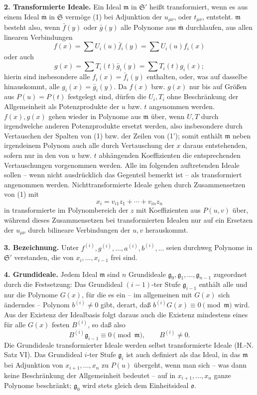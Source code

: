 \documentclass[11pt]{article}
\providecommand{\frakS}{\mathfrak S}
\providecommand{\frakm}{\mathfrak m}
\providecommand{\frakg}{\mathfrak g}
\providecommand{\frako}{\mathfrak o}
\providecommand{\barfrakm}{\overline{\mathfrak m}}
\begin{document}
\textbf{2. Transformierte Ideale.} Ein Ideal $\frakm$ in $\frakS'$ heißt transformiert, wenn es aus einem Ideal $\barfrakm$ in $\frakS$ vermöge (1) bei Adjunktion der $u_{\mu\nu}$, oder $t_{\mu\nu}$, entsteht. $\frakm$ besteht also, wenn $\bar f(y)$ oder $\bar g(y)$ alle Polynome aus $\barfrakm$ durchlaufen, aus allen linearen Verbindungen
\[
 f(x)=\sum U_i(u)\bar f_i(y)=\sum U_i(u)f_i(x)
\]
oder auch
\[
 g(x)=\sum T_i(t)\bar g_i(y)=\sum T_i(t)g_i(x);
\]
hierin sind insbesondere alle $f_i(x)=\bar f_i(y)$ enthalten, oder, was auf dasselbe hinauskommt, alle $g_i(x)=\bar g_i(y)$. Da $f(x)$ bzw. $g(x)$ nur bis auf Größen aus $P(u)=P(t)$ festgelegt sind, dürfen die $U_i,T_i$ ohne Beschränkung der Allgemeinheit als Potenzprodukte der $u$ bzw. $t$ angenommen werden. $f(x),g(x)$ gehen wieder in Polynome aus $\frakm$ über, wenn $U,T$ durch irgendwelche anderen Potenzprodukte ersetzt werden, also insbesondere durch Vertauschen der Spalten von (1) bzw. der Zeilen von (1'); somit enthält $\frakm$ neben irgendeinem Polynom auch alle durch Vertauschung der $x$ daraus entstehenden, sofern nur in den von $u$ bzw. $t$ abhängenden Koeffizienten die entsprechenden Vertauschungen vorgenommen werden. Alle im folgenden auftretenden Ideale sollen -- wenn nicht ausdrücklich das Gegenteil bemerkt ist -- als transformiert angenommen werden. Nichttransformierte Ideale gehen durch Zusammensetzen von (1) mit
\[
 x_i=v_{i1}z_1+\cdots+v_{in}z_n
\]
in transformierte im Polynombereich der $z$ mit Koeffizienten aus $P(u,v)$ über, während dieses Zusammensetzen bei transformierten Idealen nur auf ein Ersetzen der $u_{\mu\nu}$ durch bilineare Verbindungen der $u,v$ herauskommt.

\textbf{3. Bezeichnung.} Unter $f^{(i)},g^{(i)},\ldots,a^{(i)},b^{(i)},\ldots$ seien durchweg Polynome in $\frakS'$ verstanden, die von $x_i,\ldots,x_{i-1}$ frei sind.

\textbf{4. Grundideale.} Jedem Ideal $\frakm$ sind $n$ Grundideale $\frakg_0,\frakg_1,\ldots,\frakg_{n-1}$ zugeordnet durch die Festsetzung: Das Grundideal $(i-1)$-ter Stufe $\frakg_{i-1}$ enthält alle und nur die Polynome $G(x)$, für die es ein -- im allgemeinen mit $G(x)$ sich änderndes -- Polynom $b^{(i)}\ne 0$ gibt, derart, daß $b^{(i)}G(x)\equiv 0\pmod{\frakm}$ wird. Aus der Existenz der Idealbasis folgt daraus auch die Existenz mindestens eines für alle $G(x)$ festen $B^{(i)}$, so daß also
\begin{equation}
 B^{(i)}\frakg_{i-1}\equiv0\pmod{\frakm},\qquad B^{(i)}\ne0 . \tag{2}
\end{equation}
Die Grundideale transformierter Ideale werden selbst transformierte Ideale (H.-N. Satz VI). Das Grundideal $i$-ter Stufe $\frakg_i$ ist auch definiert als das Ideal, in das $\frakm$ bei Adjunktion von $x_{i+1},\ldots,x_n$ zu $P(u)$ übergeht, wenn man sich -- was dann keine Beschränkung der Allgemeinheit bedeutet -- auf in $x_{i+1},\ldots,x_n$ ganze Polynome beschränkt; $\frakg_0$ wird stets gleich dem Einheitsideal $\frako$.
\end{document}
